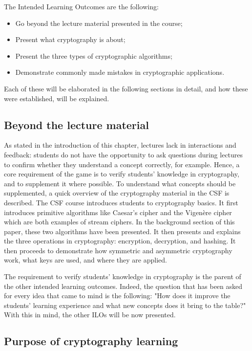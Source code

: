 \documentclass{l4proj}
\begin{document}
The Intended Learning Outcomes are the following:
\begin{itemize}
    \item Go beyond the lecture material presented in the course;
    \item Present what cryptography is about;
    \item Present the three types of cryptographic algorithms;
    \item Demonstrate commonly made mistakes in cryptographic applications.
\end{itemize}

Each of these will be elaborated in the following sections in detail, 
and how these were established, will be explained.

\subsection{Beyond the lecture material}

As stated in the introduction of this chapter, lectures lack in interactions and feedback:
students do not have the opportunity to ask questions during lectures to confirm whether they understand a concept correctly, for example.
Hence, a core requirement of the game is to verify students' knowledge in cryptography, 
and to supplement it where possible. To understand what concepts should be supplemented, 
a quick overview of the cryptography material in the CSF is described.
The CSF course introduces students to cryptography basics.
It first introduces primitive algorithms like Caesar's cipher and the Vigenère cipher which are both
examples of stream ciphers. 
In the background section of this paper, these two algorithms have been presented.
It then presents and explains the three operations in cryptography: encryption, decryption, and hashing.
It then proceeds to demonstrate how symmetric and asymmetric cryptography work, what keys are used, and where they are applied.

The requirement to verify students' knowledge in cryptography is the parent of the other intended learning outcomes. 
Indeed, the question that has been asked for every idea that came to mind is the following:
"How does it improve the students' learning experience and what new concepts does it bring to the table?"
With this in mind, the other ILOs will be now presented.

\subsection{Purpose of cryptography learning}
\end{document}
